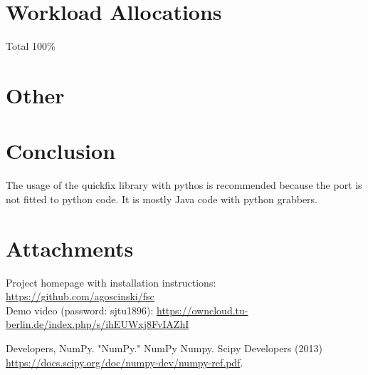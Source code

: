 \documentclass[a4paper, 11pt]{article}
\begin{document}

\section*{Workload Allocations}
Total 100\% \\

\section*{Other}
\lipsum[7]

\section*{Conclusion}
The usage of the quickfix library with pythos is recommended because the port is not fitted to python code. It is mostly Java code with python grabbers.

\section*{Attachments}
Project homepage with installation instructions: \url{https://github.com/agoscinski/fsc} \\
Demo video (password: sjtu1896): \url{https://owncloud.tu-berlin.de/index.php/s/ihEUWxj8FvIAZhI}

\begin{thebibliography}{9}
 Developers, NumPy. "NumPy." NumPy Numpy. Scipy Developers (2013) \url{https://docs.scipy.org/doc/numpy-dev/numpy-ref.pdf}.
\end{thebibliography}
\end{document}
